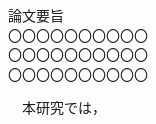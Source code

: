 \newpage
\pagestyle{empty}
\begin{center}
{論文要旨} \\
\vspace{1cm}
{ 〇〇〇〇〇〇〇〇〇〇} \\
\vspace{0.2cm}
{ 〇〇〇〇〇〇〇〇〇〇} \\
\vspace{0.2cm}
{ 〇〇〇〇〇〇〇〇〇〇} \\
\end{center}
\vspace{0.5cm}
{\large 
　本研究では，
} \\
